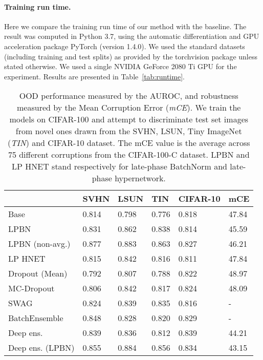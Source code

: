 \documentclass{article} \usepackage{iclr2021_conference,times}
\begin{document}
\paragraph{Training run time.} Here we compare the training run time of our method with the baseline. The result was computed in Python 3.7, using the automatic differentiation and GPU acceleration package PyTorch (version 1.4.0). We used the standard datasets (including training and test splits) as provided by the torchvision package unless stated otherwise. We used a single NVIDIA GeForce 2080 Ti GPU for the experiment. Results are presented in Table~\ref{tab:runtime}.


\setlength\intextsep{5pt}
\begin{table}
\centering
\caption{OOD performance measured by the AUROC, and robustness measured by the Mean Corruption Error (\emph{mCE}). We train the models on CIFAR-100 and attempt to discriminate test set images from novel ones drawn from the SVHN, LSUN, Tiny ImageNet (\emph{TIN}) and CIFAR-10 dataset. The mCE value is the average across 75 different corruptions from the CIFAR-100-C dataset. LPBN and LP HNET stand respectively for late-phase BatchNorm and late-phase hypernetwork. \label{tab:c100-detailed-ood}}
\label{tab:ood_mce}
\begin{tabular}{llllll}

\toprule
               & SVHN	& LSUN	& TIN	& CIFAR-10 & mCE \\\midrule
Base   &  0.814  &0.798   &0.776&0.818  & 47.84\\
LPBN     & 0.831  & 0.862  &0.838  &0.814  & 45.59       \\
LPBN (non-avg.)  &  0.877  &0.883  &0.863  &0.827  & 46.21     \\
LP HNET      &0.815 &   0.842  &0.816   &0.811  & 47.84   \\\midrule
Dropout (Mean)      & 0.792 &  0.807  &   0.788 &   0.822  & 48.97\\
MC-Dropout      & 0.806 &  0.842  &   0.817 &   0.824  & 48.09 \\

SWAG      &  0.824  &0.839  &0.835  &0.816  &  -  \\

BatchEnsemble     &  0.848  &0.828  &0.820  & 0.829  &  -     \\

\midrule
Deep ens. &  0.839  & 0.836  &0.812  &0.839  & 44.21 \\
Deep ens. (LPBN)  &  0.855  &0.884  &0.856  &0.834  &43.15 \\
\bottomrule       
\end{tabular}
\end{table}
\end{document}
